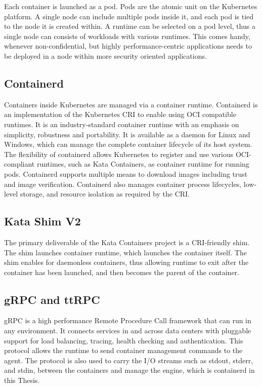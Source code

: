 Each container is launched as a pod. Pods are the atomic unit on the Kubernetes platform. A single node can include multiple pods inside it, and each pod is tied to the node it is created within. A runtime can be selected on a pod level, thus a single node can consists of workloads with various runtimes. This comes handy, whenever non-confidential, but highly performance-centric applications needs to be deployed in a node within more security oriented applications.

\subsection{Containerd}

Containers inside Kubernetes are managed via a container runtime. Containerd is an implementation of the Kubernetes CRI to enable using OCI compatible runtimes. It is an industry-standard container runtime with an emphasis on simplicity, robustness and portability. It is available as a daemon for Linux and Windows, which can manage the complete container lifecycle of its host system. The flexibility of containerd allows Kubernetes to register and use various OCI-compliant runtimes, such as Kata Containers, as container runtime for running pods. Containerd supports multiple means to download images including trust and image verification. Containerd also manages container process lifecycles, low-level storage, and resource isolation as required by the CRI. \cite{containerdGithub}\cite{containerd}

\subsection{Kata Shim V2}

The primary deliverable of the Kata Containers project is a CRI-friendly shim. The shim launches container runtime, which launches the container itself. The shim enables for daemonless containers, thus allowing runtime to exit after the container has been launched, and then becomes the parent of the container. \cite{Crosby}

\subsection{gRPC and ttRPC}

gRPC is a high performance Remote Procedure Call framework that can run in any environment. It connects services in and across data centers with pluggable support for load balancing, tracing, health checking and authentication. This protocol allows the runtime to send container management commands to the agent. The protocol is also used to carry the I/O streams such as stdout, stderr, and stdin, between the containers and manage the engine, which is containerd in this Thesis. \cite{gRPC}\cite{KataContainersArchitecture}

